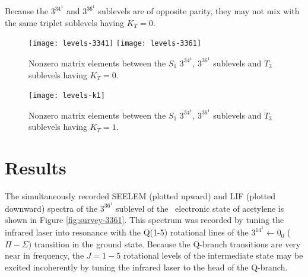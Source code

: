 \documentclass[12pt]{mitthesis}
\begin{document}
Because the $3^34^1$ and $3^36^1$  sublevels are of opposite
parity, they may not mix with the same triplet sublevels having
$K_T=0$.


\begin{figure}
  \caption{Nonzero matrix elements between the $S_1$ $3^34^1$,
    $3^36^1$  sublevels and $T_3$ sublevels having $K_T=0$.}
  \label{fig:levels-k0}
  \centering

  \texttt{[image: levels-3341]}
  \texttt{[image: levels-3361]}  
\end{figure}

\begin{figure}
  \caption{Nonzero matrix elements between the $S_1$ $3^34^1$,
    $3^36^1$  sublevels and $T_3$ sublevels having $K_T=1$.}
  \label{fig:levels-k1}
  \centering

  \texttt{[image: levels-k1]}
\end{figure}









\section{Results}

The simultaneously recorded SEELEM (plotted upward) and LIF (plotted
downward) spectra of the $3^36^1$  sublevel of the \astate\
electronic state of acetylene is shown in Figure
\ref{fig:survey-3361}.  This spectrum was recorded by tuning the
infrared laser into resonance with the Q(1-5) rotational lines of the
$3^14^1 \leftarrow 0_0$ ($\Pi - \Sigma$) transition in the ground
state.  Because the Q-branch transitions are very near in frequency,
the $J=1-5$ rotational levels of the intermediate state may be excited
incoherently by tuning the infrared laser to the head of the Q-branch.

\end{document}
